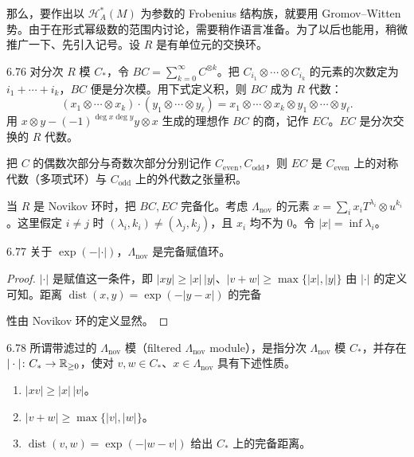 那么，要作出以 $\mathcal{H}_A^*(M)$ 为参数的 Frobenius 结构族，就要用 Gromov–Witten 势。由于在形式幂级数的范围内讨论，需要稍作语言准备。为了以后也能用，稍微推广一下、先引入记号。设 $R$ 是有单位元的交换环。

\begin{definition}{6.76}
  对分次 $R$ 模 $C_*$，令 $BC=\sum_{k=0}^\infty C^{\otimes k}$。把 $C_{i_1}\otimes\cdots\otimes C_{i_k}$ 的元素的次数定为 $i_1+\cdots+i_k$，$BC$ 便是分次模。用下式定义积，则 $BC$ 成为 $R$ 代数：
  \[
    (x_1\otimes\cdots\otimes x_k)\cdot(y_1\otimes\cdots\otimes y_\ell)
    =x_1\otimes\cdots\otimes x_k\otimes y_1\otimes\cdots\otimes y_\ell .
  \]
  用 $x\otimes y-(-1)^{\deg x\deg y}y\otimes x$ 生成的理想作 $BC$ 的商，记作 $EC$。$EC$ 是分次交换的 $R$ 代数。
\end{definition}

把 $C$ 的偶数次部分与奇数次部分分别记作 $C_{\mathrm{even}},C_{\mathrm{odd}}$，则 $EC$ 是 $C_{\mathrm{even}}$ 上的对称代数（多项式环）与 $C_{\mathrm{odd}}$ 上的外代数之张量积。


当 $R$ 是 Novikov 环时，把 $BC,EC$ 完备化。考虑 $\Lambda_{\mathrm{nov}}$ 的元素 $x=\sum_i x_iT^{\lambda_i}\otimes u^{k_i}$。这里假定 $i\ne j$ 时 $(\lambda_i,k_i)\ne(\lambda_j,k_j)$，且 $x_i$ 均不为 $0$。令 $|x|=\inf\lambda_i$。

\begin{lemma*}{6.77}
  关于 $\exp(-|\cdot|)$，$\Lambda_{\mathrm{nov}}$ 是完备赋值环。
\end{lemma*}

\begin{proof}
  $|\cdot|$ 是赋值这一条件，即 $|xy|\ge|x|\,|y|$、$|v+w|\ge\max\{|x|,|y|\}$ 由 $|\cdot|$ 的定义可知。距离 $\operatorname{dist}(x,y)=\exp(-|y-x|)$ 的完备

  性由 Novikov 环的定义显然。
\end{proof}

\begin{definition}{6.78}
  所谓带滤过的 $\Lambda_{\mathrm{nov}}$ 模（filtered $\Lambda_{\mathrm{nov}}$ module），是指分次 $\Lambda_{\mathrm{nov}}$ 模 $C_*$，并存在 $|\cdot|\colon C_*\to\mathbb{R}_{\ge0}$，使对 $v,w\in C_*$、$x\in\Lambda_{\mathrm{nov}}$ 具有下述性质。
  \begin{enumerate}[label=（\arabic*）,leftmargin=2.4em]
    \item $|xv|\ge|x|\,|v|$。
    \item $|v+w|\ge\max\{|v|,|w|\}$。
    \item $\operatorname{dist}(v,w)=\exp(-|w-v|)$ 给出 $C_*$ 上的完备距离。
  \end{enumerate}
\end{definition}

